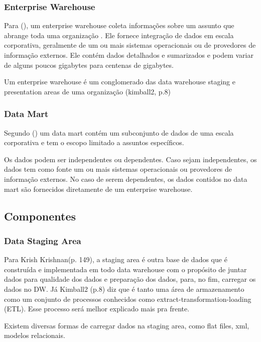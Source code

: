\subsubsection{Enterprise Warehouse}
Para \citeauthor{jmj} (\citeyear[p. 132]{jmj}), um enterprise warehouse coleta informações sobre um assunto que abrange toda uma organização . Ele fornece integração de dados em escala corporativa, geralmente de um ou mais sistemas operacionais ou de provedores de informação externos. Ele contém dados detalhados e sumarizados e podem variar de alguns poucos gigabytes para centenas de gigabytes.

Um enterprise warehouse é um conglomerado das data warehouse staging e presentation areas de uma organização (kimball2, p.8)



\subsubsection{Data Mart}
Segundo \citeauthor{jmj} (\citeyear[p. 132]{jmj}) um data mart contém um subconjunto de dados de uma escala corporativa e tem o escopo limitado a assuntos específicos.

Os dados podem ser independentes ou dependentes. Caso sejam independentes, os dados tem como fonte um ou mais sistemas operacionais ou provedores de informação externos. No caso de serem dependentes, os dados contidos no data mart são fornecidos diretamente de um enterprise warehouse.

\subsection{Componentes}

\subsubsection{Data Staging Area}
Para Krish Krishnan(p. 149), a staging area é outra base de dados que é construída e implementada em todo data warehouse com o propósito de juntar dados para qualidade dos dados e preparação dos dados, para, no fim, carregar os dados no DW. Já Kimball2 (p.8) diz que é tanto uma área de armazenamento como um conjunto de processos conhecidos como extract-transformation-loading (ETL). Esse processo será melhor explicado mais pra frente.

Existem diversas formas de carregar dados na staging area, como flat files, xml, modelos relacionais.

